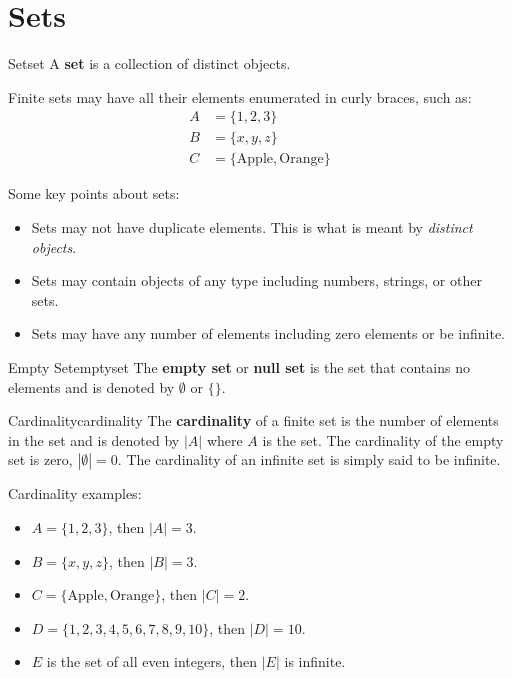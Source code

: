\section{Sets}

\begin{definition}{Set}{set}
  A \textbf{set} is a collection of distinct objects. 
\end{definition}

Finite sets may have all their elements enumerated in curly braces, such as:
\begin{align*}
  A &= \{ 1, 2, 3 \} \\
  B &= \{ x, y, z \} \\
  C &= \{ \text{Apple}, \text{Orange} \}
\end{align*}

Some key points about sets:
\begin{itemize}
  \item Sets may not have duplicate elements. This is what is meant by 
  \emph{distinct objects}.
  \item Sets may contain objects of any type including numbers, strings, or other sets.
  \item Sets may have any number of elements including zero elements or be infinite.
\end{itemize}

\begin{definition}{Empty Set}{emptyset}
  The \textbf{empty set} or \textbf{null set} is the set that contains no elements 
  and is denoted by \( \emptyset \) or \( \{ \} \).
\end{definition}

\begin{definition}{Cardinality}{cardinality}
  The \textbf{cardinality} of a finite set is the number of elements in the set and is 
  denoted by \( |A| \) where \( A \) is the set. The cardinality of the empty 
  set is zero, \( |\emptyset| = 0 \). The cardinality of an infinite set is simply said to be
  infinite.
\end{definition}

Cardinality examples:
\begin{itemize}
  \item \( A = \{ 1, 2, 3 \} \), then \( |A| = 3 \).
  \item \( B = \{ x, y, z \} \), then \( |B| = 3 \).
  \item \( C = \{ \text{Apple}, \text{Orange} \} \), then \( |C| = 2 \).
  \item \( D = \{ 1, 2, 3, 4, 5, 6, 7, 8, 9, 10 \} \), then \( |D| = 10 \).
  \item \( E \) is the set of all even integers, then \( |E| \) is infinite.
\end{itemize}

